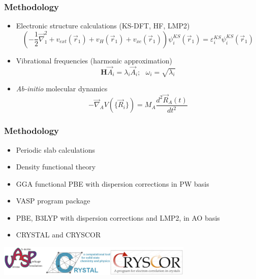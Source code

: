 \documentclass[hyperref={pdfpagelabels=false}]{beamer}
\begin{document}
\begin{frame}
 \frametitle{Methodology}
 \begin{itemize}
  \item Electronic structure calculations (KS-DFT, HF, LMP2)
  \begin{equation*}
    \left(-\frac{1}{2}\vec{\nabla}^2_1 + v_{ext}(\vec{r}_1) + v_{H}(\vec{r}_1) + v_{xc}(\vec{r}_1) \right)\psi^{KS}_i(\vec{r}_1) = \varepsilon_i^{KS}\psi^{KS}_i(\vec{r}_1)
  \end{equation*}
  \pause
  \item Vibrational frequencies (harmonic approximation)
  \begin{equation*}
    \textbf{H} \vec{A}_i=\lambda_i\vec{A}_i; ~~~  \omega_i=\sqrt{\lambda_i}
  \end{equation*}
  \pause
  \item \textit{Ab-initio} molecular dynamics
    \begin{equation*}
      -\vec{\nabla}_A V(\{\vec{R}_i\})=M_A\frac{d^2 \vec{R}_A(t)}{dt^2}
    \end{equation*}
 \end{itemize}
\end{frame}


\begin{frame}
 \frametitle{Methodology}
 \begin{itemize}
  \item Periodic slab calculations
  \item Density functional theory
  \item GGA functional PBE with dispersion corrections in PW basis
  \item VASP program package
 \end{itemize}
 \begin{itemize}
  \item PBE, B3LYP with dispersion corrections and LMP2, in AO basis
  \item CRYSTAL and CRYSCOR
 \end{itemize}
 \centering
 \includegraphics[width=0.7\textwidth]{figures/programs-logos.eps}
\end{frame}
\end{document}
